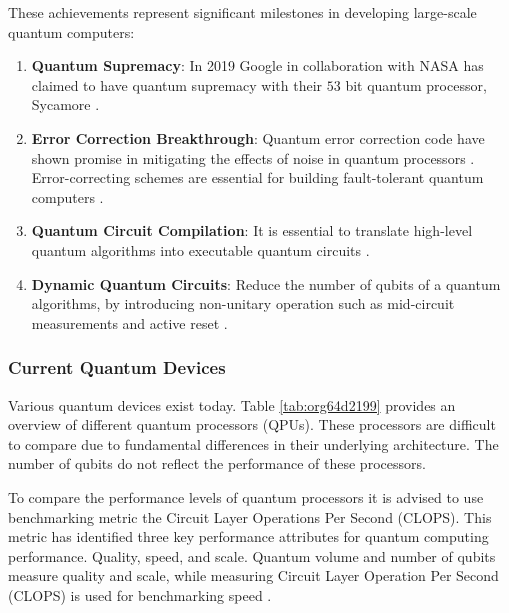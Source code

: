 \documentclass[11pt]{article}
\theoremstyle{definition}
\theoremstyle{definition}
\begin{document}
These achievements represent significant milestones in developing large-scale quantum computers:
\begin{enumerate}
\item \textbf{Quantum Supremacy}: In 2019 Google in collaboration with NASA has claimed to have quantum supremacy with
their \(53\) bit quantum processor, Sycamore \cite{arute_quantum_2019}.
\item \textbf{Error Correction Breakthrough}: Quantum error correction code have shown
promise in mitigating the effects of noise in quantum processors
\cite{Ryan_realization_2021}.
Error-correcting schemes are essential for building fault-tolerant quantum
computers \cite{preskill_quantum_2012}.
\item \textbf{Quantum Circuit Compilation}: It is essential to translate high-level quantum
algorithms into executable quantum circuits \cite{wille_qmap_2023}.
\item \textbf{Dynamic Quantum Circuits}: Reduce the number of qubits of a quantum
algorithms, by introducing non-unitary operation such as mid-circuit
measurements and active reset \cite{corcoles_exploiting_2021}.
\end{enumerate}

\subsubsection{Current Quantum Devices}
\label{sec:org8b6aaf9}
Various quantum devices exist today. Table \ref{tab:org64d2199} provides an
overview of different quantum processors (QPUs).
These processors are difficult to compare due to fundamental differences in
their underlying architecture.
The number of qubits do not reflect the performance of these processors.

To compare the performance levels of quantum processors it is advised to use
benchmarking metric the Circuit Layer Operations Per Second (CLOPS). This
metric has identified three key performance attributes for quantum computing
performance. Quality, speed, and scale. Quantum volume and number of qubits
measure quality and scale, while measuring Circuit Layer Operation Per
Second (CLOPS) is used for benchmarking speed \cite{wack_quality_2021}.
\end{document}
